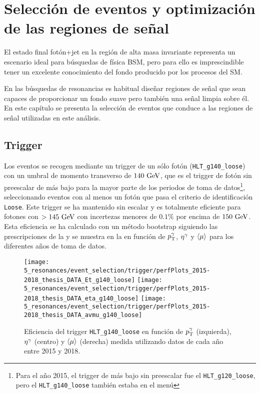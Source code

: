 \chapter{Selección de eventos y optimización de las regiones de señal}
\label{ch:evt_selection}

El estado final fotón+jet en la región de alta masa invariante representa un escenario ideal para búsquedas de física \ac{BSM}, pero para ello es imprescindible tener un excelente conocimiento del fondo producido por los procesos del \ac{SM}.

En las búsquedas de resonancias es habitual diseñar regiones de señal que sean capaces de proporcionar un fondo suave pero también una señal limpia sobre él. En este capítulo se presenta la selección de eventos que conduce a las regiones de señal utilizadas en este análisis.


\section{Trigger}
\label{sec:evt_selection:trigger}

Los eventos se recogen mediante un trigger de un sólo fotón (\texttt{HLT\_g140\_loose}) con un umbral de momento transverso de \(140~\text{GeV}\), que es el trigger de fotón sin preescalar de más bajo \pt para la mayor parte de los periodos de toma de datos\footnote{Para el año 2015, el trigger de más bajo \pt sin preescalar fue el \texttt{HLT\_g120\_loose}, pero el \texttt{HLT\_g140\_loose} también estaba en el menú}, seleccionando eventos con al menos un fotón que pasa el criterio de identificación \texttt{Loose}. Este trigger se ha mantenido sin escalar y es totalmente eficiente para fotones con \(>145~\text{GeV}\) con incertezas menores de \(0.1\%\) por encima de \(150~\text{GeV}\). Esta eficiencia se ha calculado con un método bootstrap siguiendo las prescripciones de la  y se muestra en la \Fig{\ref{fig:evt_selection:trigger:trigger_perf_15_18}} en función de \(p_{\text{T}}^{\gamma}\), \(\eta^{\gamma}\) y \(\langle \mu \rangle\) para los diferentes años de toma de datos.

\begin{figure}[ht!]
    \centering
    \texttt{[image: 5\_resonances/event\_selection/trigger/perfPlots\_2015-2018\_thesis\_DATA\_Et\_g140\_loose]}
    \texttt{[image: 5\_resonances/event\_selection/trigger/perfPlots\_2015-2018\_thesis\_DATA\_eta\_g140\_loose]}
    \texttt{[image: 5\_resonances/event\_selection/trigger/perfPlots\_2015-2018\_thesis\_DATA\_avmu\_g140\_loose]}
    \caption{Eficiencia del trigger \texttt{HLT\_g140\_loose} en función de \(p_{\text{T}}^{\gamma}\) (izquierda), \(\eta^{\gamma}\) (centro) y \(\langle \mu \rangle\) (derecha) medida utilizando datos de cada año entre 2015 y 2018.}
    \label{fig:evt_selection:trigger:trigger_perf_15_18}
\end{figure}








